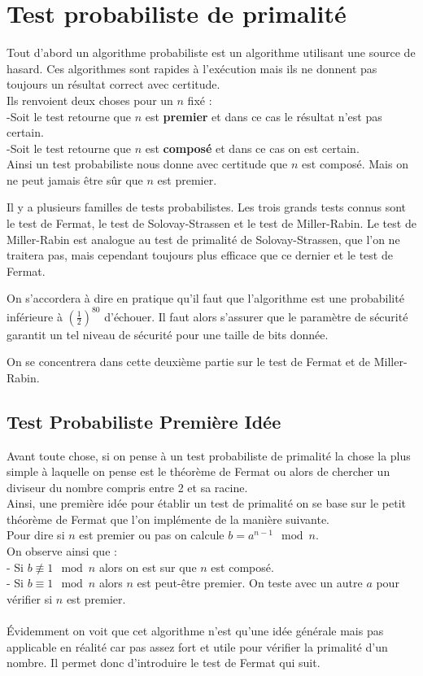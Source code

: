 \chapter{Test probabiliste de primalité}
\label{Test probabiliste de primalité}

Tout d'abord un algorithme probabiliste est un algorithme utilisant une source de hasard. Ces algorithmes sont rapides à l'exécution mais ils ne donnent pas toujours un résultat correct avec certitude.\\ Ils renvoient deux choses pour un $n$ fixé :\\
-Soit le test retourne que $n$ est \textbf{premier} et dans ce cas le résultat n'est pas certain.\\
-Soit le test retourne que $n$ est \textbf{composé} et dans ce cas on est certain.\\
Ainsi un test probabiliste nous donne avec certitude que $n$ est composé.
Mais on ne peut jamais être sûr que $n$ est premier.


Il y a plusieurs familles de tests probabilistes. 
Les trois grands tests connus sont le test de Fermat, le test de Solovay-Strassen et le test de Miller-Rabin.
Le test de Miller-Rabin est analogue au test de primalité de Solovay-Strassen, que l'on ne traitera pas, mais cependant toujours plus efficace que ce dernier et le test de Fermat.

On s'accordera à dire en pratique qu'il faut que l'algorithme est une probabilité inférieure à $\left(\frac{1}{2}\right)^{80}$ d'échouer. Il faut alors s'assurer que le paramètre de sécurité garantit un tel niveau de sécurité pour une taille de bits donnée.

On se concentrera dans cette deuxième partie sur le test de Fermat et de Miller-Rabin. 


\section{Test Probabiliste Première Idée}
Avant toute chose, si on pense à un test probabiliste de primalité la chose la plus simple à laquelle on pense est le théorème de Fermat ou alors de chercher un diviseur du nombre compris entre 2 et sa racine.\\
Ainsi, une première idée pour établir un test de primalité on se base
sur le petit théorème de Fermat que l'on implémente de la manière suivante. \\
Pour dire si $n$ est premier ou pas on calcule  $ b = a^{n-1} \mod n$.\\ On observe ainsi que : \\  
- Si  $ b \not \equiv 1 \mod n$ alors on est sur que $n$ est composé.\\
- Si $ b \equiv 1 \mod n$ alors $n$ est peut-être premier. On teste avec un autre $a$ pour vérifier si $n$ est premier.\\
\\
Évidemment on voit que cet algorithme n'est qu'une idée générale mais pas applicable en réalité car pas assez fort et utile pour vérifier la primalité d'un nombre. Il permet donc d'introduire le test de Fermat qui suit.

